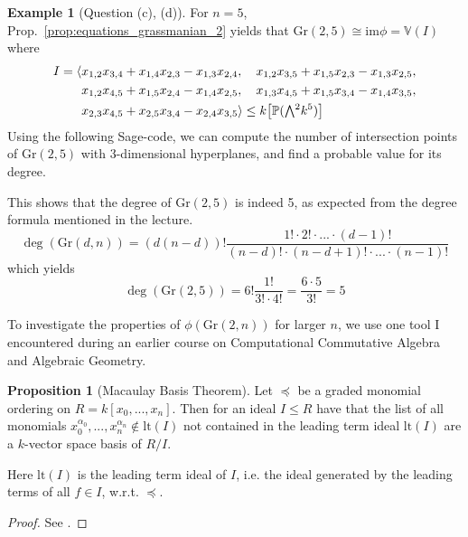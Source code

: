 \documentclass{scrartcl}
\newcommand{\V}{\mathbb{V}}
\newcommand{\Proj}{\mathbb{P}}
\newcommand{\Gr}{\mathrm{Gr}}
\newcommand{\extpow}{\mathchoice{{\textstyle\bigwedge}}
    {{\bigwedge}}
    {{\textstyle\wedge}}
    {{\scriptstyle\wedge}}}
\theoremstyle{definition}
\newtheorem{example}[subsection]{Example}
\newtheorem{proposition}[subsection]{Proposition}
\begin{document}
\begin{example}[Question (c), (d)]
    For $n = 5$, Prop.~\ref{prop:equations_grassmanian_2} yields that $\Gr(2, 5) \cong \mathrm{im}\phi = \V(I)$ where
    \begin{align*}
        I = \langle &x_{1, 2} x_{3, 4} + x_{1, 4} x_{2, 3} - x_{1, 3} x_{2, 4}, \quad x_{1, 2} x_{3, 5} + x_{1, 5} x_{2, 3} - x_{1, 3} x_{2, 5}, \\
        &x_{1, 2} x_{4, 5} + x_{1, 5} x_{2, 4} - x_{1, 4} x_{2, 5}, \quad x_{1, 3} x_{4, 5} + x_{1, 5} x_{3, 4} - x_{1, 4} x_{3, 5}, \\ 
        &x_{2, 3} x_{4, 5} + x_{2, 5} x_{3, 4} - x_{2, 4} x_{3, 5} \rangle \leq k\bigl[ \Proj(\extpow^2 k^5) \bigr]
    \end{align*}
    Using the following Sage-code, we can compute the number of intersection points of $\Gr(2, 5)$ with 3-dimensional hyperplanes, and find a probable value for its degree.
    
    This shows that the degree of $\Gr(2, 5)$ is indeed 5, as expected from the degree formula mentioned in the lecture.
    \begin{equation*}
        \deg(\Gr(d, n)) = (d(n - d))! \frac {1! \cdot 2! \cdot ... \cdot (d - 1)!} {(n - d)! \cdot (n - d + 1)! \cdot ... \cdot (n - 1)!}
    \end{equation*}
    which yields
    \begin{equation*}
        \deg(\Gr(2, 5)) = 6! \frac {1!} {3! \cdot 4!} = \frac {6 \cdot 5} {3!} = 5
    \end{equation*}
\end{example}
To investigate the properties of $\phi(\Gr(2, n))$ for larger $n$, we use one tool I encountered during an earlier course on Computational Commutative Algebra and Algebraic Geometry.
\begin{proposition}[Macaulay Basis Theorem]
    \label{prop:macaulay_basis_theorem}
    Let $\preceq$ be a graded monomial ordering on $R = k[x_0, ..., x_n]$.
    Then for an ideal $I \leq R$ have that the list of all monomials $x_0^{\alpha_0}, ..., x_n^{\alpha_n} \notin \mathrm{lt}(I)$ not contained in the leading term ideal $\mathrm{lt}(I)$ are a $k$-vector space basis of $R/I$.

    Here $\mathrm{lt}(I)$ is the leading term ideal of $I$, i.e. the ideal generated by the leading terms of all $f \in I$, w.r.t. $\preceq$.
\end{proposition}
\begin{proof}
    See \cite{kreuzer}.
\end{proof}
\end{document}
